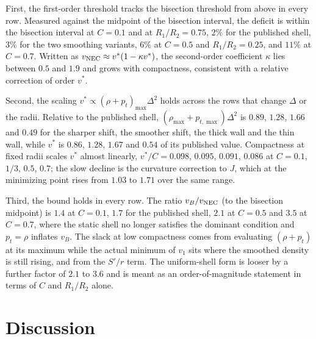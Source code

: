 \documentclass[11pt,a4paper]{article}
\theoremstyle{remark}
\begin{document}
First, the first-order threshold tracks the bisection threshold from above in every row. Measured against the midpoint of the bisection interval, the deficit is within the bisection interval at $C = 0.1$ and at $R_1/R_2 = 0.75$, $2\%$ for the published shell, $3\%$ for the two smoothing variants, $6\%$ at $C = 0.5$ and $R_1/R_2 = 0.25$, and $11\%$ at $C = 0.7$. Written as $v_{\rm NEC} \approx v^*(1 - \kappa v^*)$, the second-order coefficient $\kappa$ lies between $0.5$ and $1.9$ and grows with compactness, consistent with a relative correction of order $v^*$.

Second, the scaling $v^* \propto (\rho+p_t)_{\max}\Delta^2$ holds across the rows that change $\Delta$ or the radii. Relative to the published shell, $(\rho_{\max}+p_{t,\max})\Delta^2$ is $0.89$, $1.28$, $1.66$ and $0.49$ for the sharper shift, the smoother shift, the thick wall and the thin wall, while $v^*$ is $0.86$, $1.28$, $1.67$ and $0.54$ of its published value. Compactness at fixed radii scales $v^*$ almost linearly, $v^*/C = 0.098$, $0.095$, $0.091$, $0.086$ at $C = 0.1$, $1/3$, $0.5$, $0.7$; the slow decline is the curvature correction to $J$, which at the minimizing point rises from $1.03$ to $1.71$ over the same range.

Third, the bound holds in every row. The ratio $v_B/v_{\rm NEC}$ (to the bisection midpoint) is $1.4$ at $C = 0.1$, $1.7$ for the published shell, $2.1$ at $C = 0.5$ and $3.5$ at $C = 0.7$, where the static shell no longer satisfies the dominant condition and $p_t = \rho$ inflates $v_B$. The slack at low compactness comes from evaluating $(\rho+p_t)$ at its maximum while the actual minimum of $v_1$ sits where the smoothed density is still rising, and from the $S'/r$ term. The uniform-shell form is looser by a further factor of $2.1$ to $3.6$ and is meant as an order-of-magnitude statement in terms of $C$ and $R_1/R_2$ alone.

\section{Discussion}\label{sec:disc}
\end{document}
